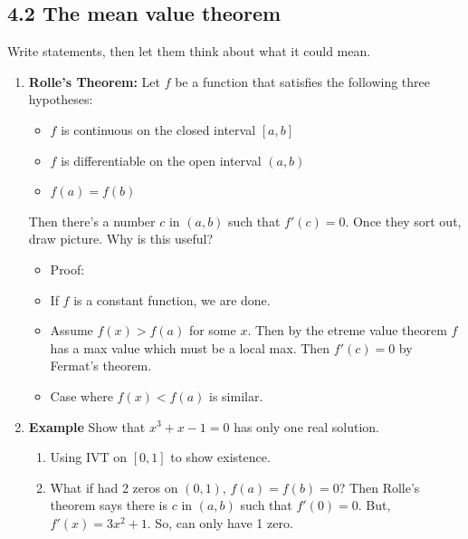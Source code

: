 \documentclass{article}
\begin{document}
\subsection{4.2 The mean value theorem}
Write statements, then let them think about what it could mean.
\begin{enumerate}

\item {\bf Rolle's Theorem:} Let $f$ be a function that satisfies the following three hypotheses: 
\begin{itemize}
\item $f$ is continuous on the closed interval $[a,b]$
\item $f$ is differentiable on the open interval $(a,b)$
\item $f(a) = f(b)$
\end{itemize}
Then there's a number $c$ in $(a,b)$ such that $f'(c) = 0$. Once they sort out, draw picture. Why is this useful?
\begin{itemize}
\item Proof:
\item If $f$ is a constant function, we are done.
\item Assume $f(x)>f(a)$ for some $x$. Then by the etreme value theorem $f$ has a max value which must be a local max. Then $f'(c)=0$ by Fermat's theorem.
\item Case where $f(x)<f(a)$ is similar.
\end{itemize}

\item {\bf Example} Show that $x^3+x-1 = 0$ has only one real solution.
\begin{enumerate}
\item Using IVT on $[0,1]$ to show existence.
\item What if had 2 zeros on $(0,1)$, $f(a)=f(b)=0$? Then Rolle's theorem says there is $c$ in $(a,b)$ such that $f'(0)=0$. But, $f'(x)=3x^2+1$. So, can only have 1 zero.
\end{enumerate}


\end{enumerate}
\end{document}
